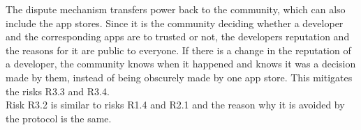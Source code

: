 The dispute mechanism transfers power back to the community, which can also include the app stores. Since it is the community deciding whether a developer and the corresponding apps are to trusted or not, the developers reputation and the reasons for it are public to everyone. If there is a change in the reputation of a developer, the community knows when it happened and knows it was a decision made by them, instead of being obscurely made by one app store. This mitigates the risks \textsf{R3.3} and \textsf{R3.4}. \\

Risk \textsf{R3.2} is similar to risks \textsf{R1.4} and \textsf{R2.1} and the reason why it is avoided by the protocol is the same.












%
%
%






%


